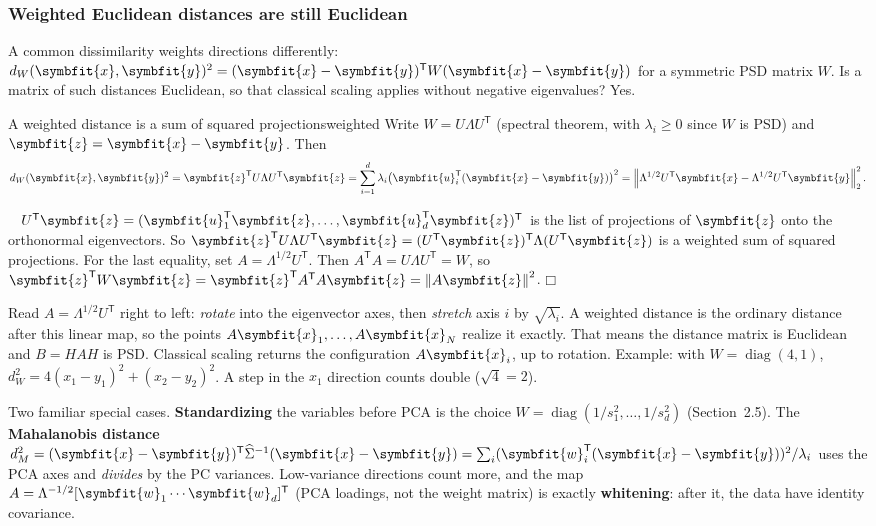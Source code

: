 \documentclass[11pt]{article}
\newcommand{\bm}[1]{\symbfit{#1}}
\newenvironment{proofsketch}{\par\noindent{\itshape Proof.}\ }{\hfill$\mdlgwhtsquare$\par}
\newcommand{\vx}{\bm{x}}
\newcommand{\vy}{\bm{y}}
\newcommand{\vw}{\bm{w}}
\newcommand{\vu}{\bm{u}}
\newcommand{\Sig}{\widehat{\Sigma}}
\newcommand{\T}{^{\mathsf T}}
\newcommand{\diag}{\operatorname{diag}}
\newcommand{\norm}[1]{\left\lVert #1\right\rVert}
\begin{document}
\subsubsection*{Weighted Euclidean distances are still Euclidean}

A common dissimilarity weights directions differently:
$d_W(\vx,\vy)^2=(\vx-\vy)\T W(\vx-\vy)$ for a symmetric PSD matrix $W$. Is a matrix of such
distances Euclidean, so that classical scaling applies without negative eigenvalues? Yes.

\begin{proposition}{A weighted distance is a sum of squared projections}{weighted}
Write $W=U\Lambda U\T$ (spectral theorem, with $\lambda_i\ge0$ since $W$ is PSD) and $\bm z=\vx-\vy$. Then
\[
d_W(\vx,\vy)^2=\bm z\T U\Lambda U\T\bm z=\sum_{i=1}^d\lambda_i\big(\vu_i\T(\vx-\vy)\big)^2
=\norm{\Lambda^{1/2}U\T\vx-\Lambda^{1/2}U\T\vy}_2^2 .
\]
\end{proposition}
\begin{proofsketch}
$U\T\bm z=(\vu_1\T\bm z,\dots,\vu_d\T\bm z)\T$ is the list of projections of $\bm z$
onto the orthonormal eigenvectors. So $\bm z\T U\Lambda U\T\bm z=(U\T\bm z)\T\Lambda(U\T\bm z)$
is a weighted sum of squared projections. For the last equality, set $A=\Lambda^{1/2}U\T$.
Then $A\T A=U\Lambda U\T=W$, so $\bm z\T W\bm z=\bm z\T A\T A\bm z=\norm{A\bm z}^2$.
\end{proofsketch}

\begin{intuition}
Read $A=\Lambda^{1/2}U\T$ right to left: \emph{rotate} into the eigenvector axes, then
\emph{stretch} axis $i$ by $\sqrt{\lambda_i}$. A weighted distance is the ordinary
distance after this linear map, so the points $A\vx_1,\dots,A\vx_N$ realize it exactly.
That means the distance matrix is Euclidean and $B=HAH$ is PSD. Classical scaling
returns the configuration $A\vx_i$, up to rotation. Example: with $W=\diag(4,1)$,
$d_W^2=4(x_1-y_1)^2+(x_2-y_2)^2$. A step in the $x_1$ direction counts double
($\sqrt4=2$).
\end{intuition}

\begin{deeper}
Two familiar special cases. \textbf{Standardizing} the variables before PCA is the choice
$W=\diag(1/s_1^2,\dots,1/s_d^2)$ (Section~2.5). The \textbf{Mahalanobis distance}
$d_M^2=(\vx-\vy)\T\Sig^{-1}(\vx-\vy)=\sum_i(\vw_i\T(\vx-\vy))^2/\lambda_i$ uses the
PCA axes and \emph{divides} by the PC variances. Low-variance directions count more, and
the map $A=\Lambda^{-1/2}[\vw_1\cdots\vw_d]\T$ (PCA loadings, not the weight matrix) is exactly \textbf{whitening}: after it, the data have
identity covariance.
\end{deeper}
\end{document}
